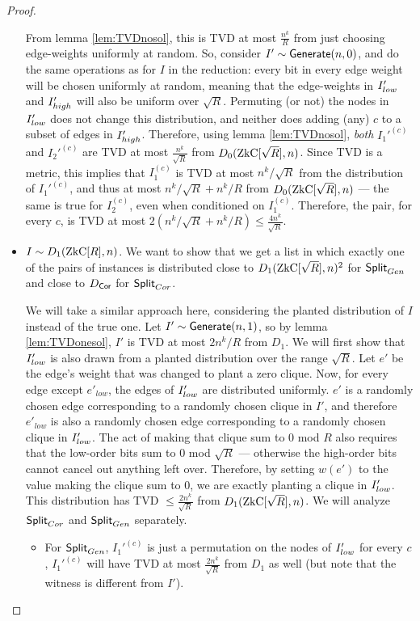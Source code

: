 \begin{proof}
\begin{itemize}
		From lemma \ref{lem:TVDnosol}, this is TVD at most $\frac {n^k}{R}$ from just choosing edge-weights uniformly at random. So, consider $I' \sim \mathsf{Generate}(n,0)$, and do the same operations as for $I$ in the reduction: every bit in every edge weight will be chosen uniformly at random, meaning that the edge-weights in $I_{low}'$ and $I_{high}'$ will also be uniform over $\sqrt R$. Permuting (or not) the nodes in $I_{low}'$ does not change this distribution, and neither does adding (any) $c$ to a subset of edges in $I_{high}'$. Therefore, using lemma \ref{lem:TVDnosol}, \emph{both} $I_1'^{(c)}$ and $I_2'^{(c)}$ are TVD at most $\frac{n^k}{\sqrt R}$ from $D_0(\ZkC[\sqrt R], n)$. Since TVD is a metric, this implies that $I_1^{(c)}$ is TVD at most $n^k / \sqrt R$ from the distribution of $I_1'^{(c)}$, and thus at most $n^k / \sqrt R + n^k/ R$ from $D_0(\ZkC[\sqrt R], n)$ --- the same is true for $I_2^{(c)}$, even when conditioned on $I_1^{(c)}$. Therefore, the pair, for every $c$, is TVD at most $2(n^k / \sqrt R + n^k/ R) \le \frac{4 n^k}{\sqrt R}$.
		
		
		\item $I \sim D_1(\ZkC[R], n)$. We want to show that we get a list in which exactly one of the pairs of instances is distributed close to $D_1(\ZkC[\sqrt R], n)^2$ for $\mathsf{Split}_{Gen}$ and close to $D_{\mathsf{Cor}}$ for $\mathsf{Split}_{Cor}$.
		
		We will take a similar approach here, considering the planted distribution of $I$ instead of the true one. Let $I' \sim \mathsf{Generate}(n,1)$, so by lemma \ref{lem:TVDonesol}, $I'$ is TVD at most $2n^k/R$ from $D_1$. We will first show that $I_{low}'$ is also drawn from a planted distribution over the range $\sqrt R$.
		Let $e'$ be the edge's weight that was changed to plant a zero clique. Now, for every edge except $e'_{low}$, the edges of $I_{low}'$ are distributed uniformly. $e'$ is a randomly chosen edge corresponding to a randomly chosen clique in $I'$, and therefore $e'_{low}$ is also a randomly chosen edge corresponding to a randomly chosen clique in $I_{low}'$. The act of making that clique sum to 0 mod $R$ also requires that the low-order bits sum to $0$ mod $\sqrt R$ --- otherwise the high-order bits cannot cancel out anything left over. Therefore, by setting $w(e')$ to the value making the clique sum to 0, we are exactly planting a clique in $I_{low}'$. This distribution has TVD $\le \frac{2n^k}{\sqrt R}$ from $D_1(\ZkC[\sqrt R], n)$. We will analyze $\mathsf{Split}_{Cor}$ and $\mathsf{Split}_{Gen}$ separately.
		
		\begin{itemize}
			\item For $\mathsf{Split}_{Gen}$, $I_1'^{(c)}$ is just a permutation on the nodes of $I_{low}'$ for every $c$, $I_1'^{(c)}$ will have TVD at most $\frac{2n^k}{\sqrt R}$ from $D_1$ as well (but note that the witness is different from $I'$).
			

\end{itemize}
\end{itemize}
\end{proof}

